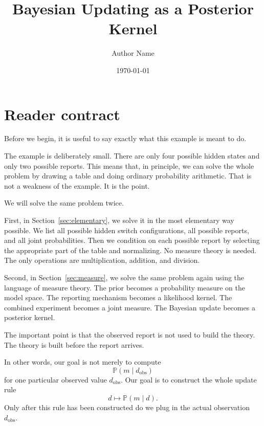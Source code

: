 \documentclass[11pt]{article}
\title{Bayesian Updating as a Posterior Kernel}
\author{Author Name}
\date{\today}
\newcommand{\dobs}{d_{\mathrm{obs}}}
\begin{document}
\maketitle
\tableofcontents

\begin{abstract}
\end{abstract}

\section*{Reader contract}

Before we begin, it is useful to say exactly what this example is meant to do.

The example is deliberately small. There are only four possible hidden states and only two possible reports. This means that, in principle, we can solve the whole problem by drawing a table and doing ordinary probability arithmetic. That is not a weakness of the example. It is the point.

We will solve the same problem twice.

First, in Section~\ref{sec:elementary}, we solve it in the most elementary way possible. We list all possible hidden switch configurations, all possible reports, and all joint probabilities. Then we condition on each possible report by selecting the appropriate part of the table and normalizing. No measure theory is needed. The only operations are multiplication, addition, and division.

Second, in Section~\ref{sec:measure}, we solve the same problem again using the language of measure theory. The prior becomes a probability measure on the model space. The reporting mechanism becomes a likelihood kernel. The combined experiment becomes a joint measure. The Bayesian update becomes a posterior kernel.

The important point is that the observed report is not used to build the theory. The theory is built before the report arrives.

In other words, our goal is not merely to compute
\[
    \mathbb{P}(m \mid \dobs)
\]
for one particular observed value \(\dobs\). Our goal is to construct the whole update rule
\[
    d \longmapsto \mathbb{P}(m \mid d).
\]
Only after this rule has been constructed do we plug in the actual observation \(\dobs\).
\end{document}
